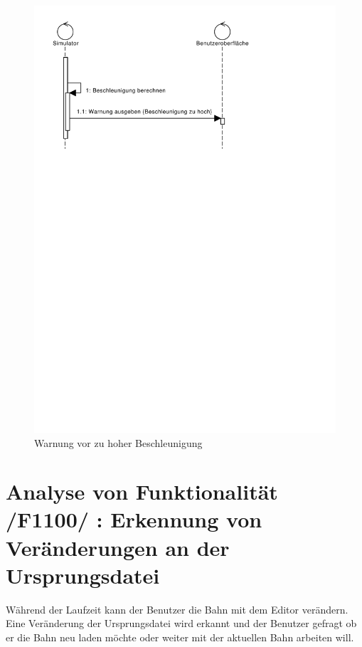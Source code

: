\begin{figure}[h!]
\includegraphics[width=\linewidth]{bilder/Warnung_Beschleunigung}
\caption{Warnung vor zu hoher Beschleunigung}
\label{fig:Warnung_Beschleunigung}
\end{figure}
\section{Analyse von Funktionalität /F1100/ :  Erkennung von Veränderungen an der Ursprungsdatei}
Während der Laufzeit kann der Benutzer die Bahn mit dem Editor verändern.
Eine Veränderung der Ursprungsdatei wird erkannt und der Benutzer gefragt ob er die Bahn neu laden möchte oder weiter mit der aktuellen Bahn arbeiten will.
